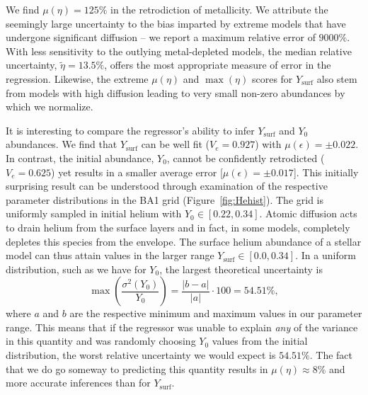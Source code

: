 We find  ${\mu (\eta) = 125\%}$ in the retrodiction of metallicity. We attribute the seemingly large uncertainty to the bias imparted by extreme models that have undergone significant diffusion -- we report a maximum relative error of $9000\%$. With less sensitivity to the outlying metal-depleted models, the median relative uncertainty, ${\tilde{\eta} = 13.5\%}$, offers the most appropriate measure of error in the regression. 
Likewise, the extreme ${\mu (\eta)}$ and $\max(\eta)$ scores for $Y_{\text{surf}}$ also stem from models with high diffusion leading to very small non-zero abundances by which we normalize. 

It is interesting to compare the regressor's ability to infer $Y_{\text{surf}}$ and $Y_0$ abundances. We find that  $Y_{\text{surf}}$ can be well fit (${V_e = 0.927}$) with ${\mu (\epsilon) = \pm 0.022}$. In contrast, the initial abundance, $Y_0$, cannot be confidently retrodicted  (${V_e=0.625}$) yet results in a smaller average error [${\mu (\epsilon) = \pm 0.017}$]. 
This initially surprising result can be understood through examination of the respective parameter distributions in the BA1 grid (Figure~\ref{fig:Hehist}).
The grid is uniformly sampled in initial helium with ${Y_0 \in [0.22, 0.34]}$. 
Atomic diffusion acts to drain helium from the surface layers and in fact, in some models, completely depletes this species from the envelope. 
The surface helium abundance of a stellar model can thus attain values in the larger range
${Y_{\text{surf}} \in [0.0, 0.34]}$.  %
In a  uniform distribution, such as we have for $Y_0$, the largest theoretical uncertainty  is 
\begin{equation}
    \max \left( \frac{\sigma^2(Y_0)}{Y_0} \right) = \frac{|b-a|}{|a|} \cdot 100 = 54.51\%,
\end{equation}
where $a$ and $b$ are the respective minimum and maximum values in our parameter range.  
This means that if the regressor was unable to explain \emph{any} of the variance in this quantity and was randomly choosing $Y_0$ values from the initial distribution, the worst relative uncertainty we would expect is $54.51\%$. The fact that we do go someway to predicting this quantity results in ${\mu (\eta) \approx 8\% }$ and more accurate inferences than for $Y_{\text{surf}}$. 







